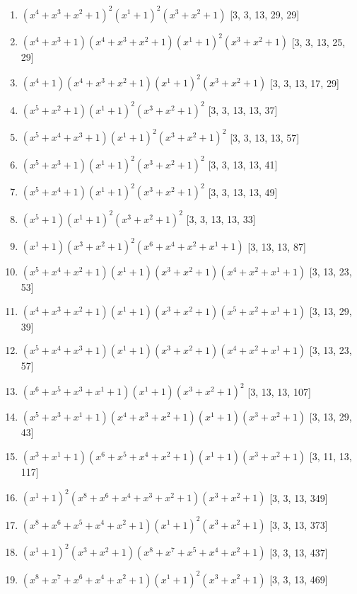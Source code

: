 \documentclass[10pt,twocolumn]{article}
\begin{document}
\begin{enumerate}
\item $(x^{4} + x^{3} + x^{2} + 1)^{2}(x^{1} + 1)^{2}(x^{3} + x^{2} + 1)$  [3, 3, 13, 29, 29]
\item $(x^{4} + x^{3} + 1)(x^{4} + x^{3} + x^{2} + 1)(x^{1} + 1)^{2}(x^{3} + x^{2} + 1)$  [3, 3, 13, 25, 29]
\item $(x^{4} + 1)(x^{4} + x^{3} + x^{2} + 1)(x^{1} + 1)^{2}(x^{3} + x^{2} + 1)$  [3, 3, 13, 17, 29]
\item $(x^{5} + x^{2} + 1)(x^{1} + 1)^{2}(x^{3} + x^{2} + 1)^{2}$  [3, 3, 13, 13, 37]
\item $(x^{5} + x^{4} + x^{3} + 1)(x^{1} + 1)^{2}(x^{3} + x^{2} + 1)^{2}$  [3, 3, 13, 13, 57]
\item $(x^{5} + x^{3} + 1)(x^{1} + 1)^{2}(x^{3} + x^{2} + 1)^{2}$  [3, 3, 13, 13, 41]
\item $(x^{5} + x^{4} + 1)(x^{1} + 1)^{2}(x^{3} + x^{2} + 1)^{2}$  [3, 3, 13, 13, 49]
\item $(x^{5} + 1)(x^{1} + 1)^{2}(x^{3} + x^{2} + 1)^{2}$  [3, 3, 13, 13, 33]
\item $(x^{1} + 1)(x^{3} + x^{2} + 1)^{2}(x^{6} + x^{4} + x^{2} + x^{1} + 1)$  [3, 13, 13, 87]
\item $(x^{5} + x^{4} + x^{2} + 1)(x^{1} + 1)(x^{3} + x^{2} + 1)(x^{4} + x^{2} + x^{1} + 1)$  [3, 13, 23, 53]
\item $(x^{4} + x^{3} + x^{2} + 1)(x^{1} + 1)(x^{3} + x^{2} + 1)(x^{5} + x^{2} + x^{1} + 1)$  [3, 13, 29, 39]
\item $(x^{5} + x^{4} + x^{3} + 1)(x^{1} + 1)(x^{3} + x^{2} + 1)(x^{4} + x^{2} + x^{1} + 1)$  [3, 13, 23, 57]
\item $(x^{6} + x^{5} + x^{3} + x^{1} + 1)(x^{1} + 1)(x^{3} + x^{2} + 1)^{2}$  [3, 13, 13, 107]
\item $(x^{5} + x^{3} + x^{1} + 1)(x^{4} + x^{3} + x^{2} + 1)(x^{1} + 1)(x^{3} + x^{2} + 1)$  [3, 13, 29, 43]
\item $(x^{3} + x^{1} + 1)(x^{6} + x^{5} + x^{4} + x^{2} + 1)(x^{1} + 1)(x^{3} + x^{2} + 1)$  [3, 11, 13, 117]
\item $(x^{1} + 1)^{2}(x^{8} + x^{6} + x^{4} + x^{3} + x^{2} + 1)(x^{3} + x^{2} + 1)$  [3, 3, 13, 349]
\item $(x^{8} + x^{6} + x^{5} + x^{4} + x^{2} + 1)(x^{1} + 1)^{2}(x^{3} + x^{2} + 1)$  [3, 3, 13, 373]
\item $(x^{1} + 1)^{2}(x^{3} + x^{2} + 1)(x^{8} + x^{7} + x^{5} + x^{4} + x^{2} + 1)$  [3, 3, 13, 437]
\item $(x^{8} + x^{7} + x^{6} + x^{4} + x^{2} + 1)(x^{1} + 1)^{2}(x^{3} + x^{2} + 1)$  [3, 3, 13, 469]

\end{enumerate}
\end{document}
